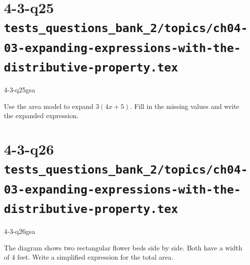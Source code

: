 \documentclass[12pt, fleqn, openany]{studyGuide}
\begin{document}
\newpage
\section*{4-3-q25 \hfill \normalsize\texttt{tests\_questions\_bank\_2/topics/ch04-03-expanding-expressions-with-the-distributive-property.tex}}
\begin{practiceQuestion}{4-3-q25}{gsa}
\begin{questionText}
Use the area model to expand $3(4x + 5)$. Fill in the missing values and write the expanded expression.

\begin{center}
\end{center}
\end{questionText}
\end{practiceQuestion}

\newpage
\section*{4-3-q26 \hfill \normalsize\texttt{tests\_questions\_bank\_2/topics/ch04-03-expanding-expressions-with-the-distributive-property.tex}}
\begin{practiceQuestion}{4-3-q26}{gsa}
\begin{questionText}
The diagram shows two rectangular flower beds side by side. Both have a width of $4$ feet. Write a simplified expression for the total area.

\begin{center}
\end{center}
\end{questionText}
\end{practiceQuestion}
\end{document}
